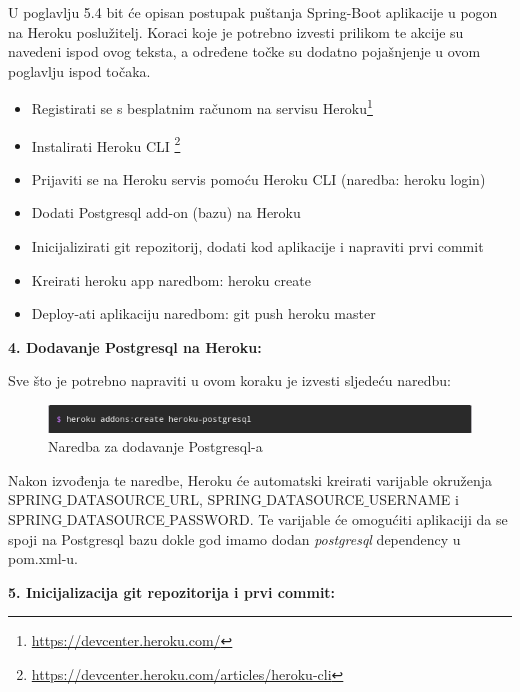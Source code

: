 	U poglavlju 5.4 bit će opisan postupak puštanja Spring-Boot aplikacije u pogon na Heroku poslužitelj.
			Koraci koje je potrebno izvesti prilikom te akcije su navedeni ispod ovog teksta, a određene točke su dodatno pojašnjenje u ovom poglavlju ispod točaka.
	
	
	\begin{itemize}
		\item[1.] Registirati se s besplatnim računom na servisu Heroku\footnote{\url{https://devcenter.heroku.com/}}
		\item[2.] Instalirati Heroku CLI \footnote{\url{https://devcenter.heroku.com/articles/heroku-cli}}
		\item[3.] Prijaviti se na Heroku servis pomoću Heroku CLI (naredba: heroku login)
		\item[4.] Dodati Postgresql add-on (bazu) na Heroku  
		\item[5.] Inicijalizirati git repozitorij, dodati kod aplikacije i napraviti prvi commit
		\item[6.] Kreirati heroku app naredbom: heroku create
		\item[7.] Deploy-ati aplikaciju naredbom: git push heroku master
	\end{itemize}

	\noindent\textbf{4. Dodavanje Postgresql na Heroku:}
	
		Sve što je potrebno napraviti u ovom koraku je izvesti sljedeću naredbu:
		
		\begin{figure}[H]
			\includegraphics[scale=0.8]{slike/createDatabase.png} %
			\centering
			\caption { Naredba za dodavanje Postgresql-a}
			\label{fig:5.2}
		\end{figure}
	
		Nakon izvođenja te naredbe, Heroku će automatski kreirati varijable okruženja SPRING${\_}$DATASOURCE${\_}$URL, SPRING${\_}$DATASOURCE${\_}$USERNAME i \newline SPRING${\_}$DATASOURCE${\_}$PASSWORD. Te varijable će omogućiti aplikaciji da se spoji na Postgresql bazu dokle god imamo dodan \textit{postgresql} dependency u pom.xml-u.
	
	\bigskip
		
	\noindent\textbf{5. Inicijalizacija git repozitorija i prvi commit:}
		
